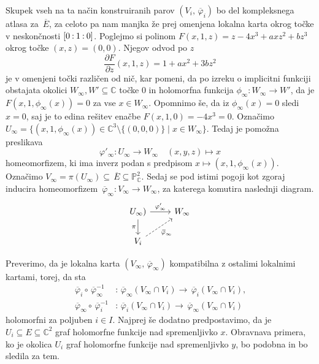 \documentclass[mat1]{fmfdelo}
\numberwithin{equation}{section}
\newcommand{\C}{\mathbb C}
\newcommand{\PC}{\mathbb{P}^2_\C}
\newcommand{\inv}{^{-1}}
\newcommand{\pcoor}[1]{%
\begingroup\lccode`~=`: \lowercase{\endgroup
\edef~}{\mathbin{\mathchar\the\mathcode`:}\nobreak}%
\left[%
\begingroup
\mathcode`:=\string"8000
#1%
\endgroup
\right]%
}
\newcommand{\pdv}[2][]{\frac{\partial#1}{\partial#2}}
\newcommand{\olsi}[1]{\,\overline{\!{#1}}} %
\theoremstyle{definition}
\begin{document}
Skupek vseh na ta način konstruiranih parov $(V_i, \olsi{\varphi}_i)$ bo del kompleksnega atlasa za $\olsi{E}$, za celoto pa nam manjka že prej omenjena lokalna karta okrog točke v neskončnosti $\pcoor{0 : 1 : 0}$. Poglejmo si polinom $F(x, 1, z) = z - 4x^3 + axz^2 + bz^3$ okrog točke $(x,z) = (0,0)$. Njegov odvod po $z$ 
\[
    \pdv[F]{z}(x,1,z) = 1 + ax^2 + 3bz^2
\]
je v omenjeni točki različen od nič, kar pomeni, da po izreku o implicitni funkciji obstajata okolici $W_\infty, W' \subseteq \C$ točke $0$ in holomorfna funkcija $\phi_\infty : W_\infty \to W'$, da je $F(x, 1, \phi_\infty(x)) = 0$ za vse $x \in W_\infty$. Opomnimo še, da iz $\phi_\infty(x) = 0$ sledi $x = 0$, saj je to edina rešitev enačbe $F(x, 1, 0) = -4x^3 = 0$. Označimo $U_\infty = \{(x, 1, \phi_\infty(x)) \in \C^3 \setminus \{(0,0,0)\}\mid x \in W_\infty\}$. Tedaj je pomožna preslikava 
\[
    \varphi'_\infty : U_\infty \to W_\infty \quad (x,y,z) \mapsto x
\]
homeomorfizem, ki ima inverz podan s predpisom $x \mapsto (x,1,\phi_\infty(x))$. Označimo $V_\infty = \pi(U_\infty) \subseteq \olsi{E} \subseteq \PC$. Sedaj se pod istimi pogoji kot zgoraj inducira homeomorfizem $\olsi{\varphi}_\infty : V_\infty \to W_\infty$, za katerega komutira naslednji diagram.
%
\begin{equation}
    \label{projektivna karta v inf diagram}  
    \begin{tikzcd}
	{U_\infty)} & {W_\infty} \\
	{V_i}
	\arrow["{\varphi'_\infty}", from=1-1, to=1-2]
	\arrow["\pi"', from=1-1, to=2-1]
	\arrow["{\olsi{\varphi}_\infty}"', dashed, from=2-1, to=1-2]
    \end{tikzcd}
\end{equation}

Preverimo, da je lokalna karta $(V_\infty, \olsi{\varphi}_\infty)$ kompatibilna z ostalimi lokalnimi kartami, torej, da sta
\begin{align*}
    \olsi{\varphi}_i \circ \olsi{\varphi}_\infty\inv &: \olsi{\varphi}_\infty(V_\infty \cap V_i) \to \olsi{\varphi}_i(V_\infty \cap V_i), \\
    \olsi{\varphi}_\infty \circ \olsi{\varphi}_i\inv &: \olsi{\varphi}_i(V_\infty \cap V_i) \to \olsi{\varphi}_\infty(V_\infty \cap V_i)
\end{align*}
holomorfni za poljuben $i \in I$. Najprej še dodatno predpostavimo, da je $U_i \subseteq E \subseteq \C^2$ graf holomorfne funkcije nad spremenljivko $x$. Obravnava primera, ko je okolica $U_i$ graf holomorfne funkcije nad spremenljivko $y$, bo podobna in bo sledila za tem.
\end{document}
